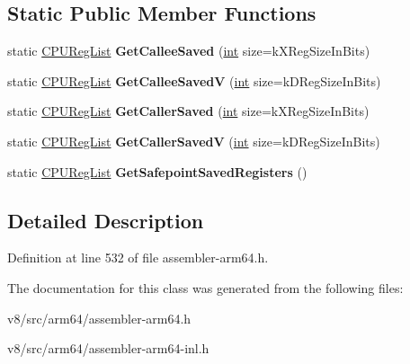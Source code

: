 \subsection*{Static Public Member Functions}
\begin{DoxyCompactItemize}
\item 
\mbox{\label{classv8_1_1internal_1_1CPURegList_aa93111752064f4cf3890d07338fadaf3}} 
static \mbox{\hyperlink{classv8_1_1internal_1_1CPURegList}{C\+P\+U\+Reg\+List}} {\bfseries Get\+Callee\+Saved} (\mbox{\hyperlink{classint}{int}} size=k\+X\+Reg\+Size\+In\+Bits)
\item 
\mbox{\label{classv8_1_1internal_1_1CPURegList_a4759cabbf66c74068cde77cf207a8f05}} 
static \mbox{\hyperlink{classv8_1_1internal_1_1CPURegList}{C\+P\+U\+Reg\+List}} {\bfseries Get\+Callee\+SavedV} (\mbox{\hyperlink{classint}{int}} size=k\+D\+Reg\+Size\+In\+Bits)
\item 
\mbox{\label{classv8_1_1internal_1_1CPURegList_a2ee8023b6245eccd0e20254237dfab75}} 
static \mbox{\hyperlink{classv8_1_1internal_1_1CPURegList}{C\+P\+U\+Reg\+List}} {\bfseries Get\+Caller\+Saved} (\mbox{\hyperlink{classint}{int}} size=k\+X\+Reg\+Size\+In\+Bits)
\item 
\mbox{\label{classv8_1_1internal_1_1CPURegList_a2e99553c96b19db06c0fad774581c847}} 
static \mbox{\hyperlink{classv8_1_1internal_1_1CPURegList}{C\+P\+U\+Reg\+List}} {\bfseries Get\+Caller\+SavedV} (\mbox{\hyperlink{classint}{int}} size=k\+D\+Reg\+Size\+In\+Bits)
\item 
\mbox{\label{classv8_1_1internal_1_1CPURegList_a4d6b95883ff0eab27f43bf9da8f3e621}} 
static \mbox{\hyperlink{classv8_1_1internal_1_1CPURegList}{C\+P\+U\+Reg\+List}} {\bfseries Get\+Safepoint\+Saved\+Registers} ()
\end{DoxyCompactItemize}


\subsection{Detailed Description}


Definition at line 532 of file assembler-\/arm64.\+h.



The documentation for this class was generated from the following files\+:\begin{DoxyCompactItemize}
\item 
v8/src/arm64/assembler-\/arm64.\+h\item 
v8/src/arm64/assembler-\/arm64-\/inl.\+h\end{DoxyCompactItemize}
